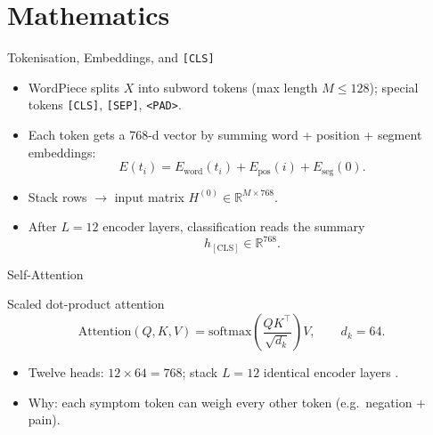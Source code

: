 \section{Mathematics}

\begin{frame}{Tokenisation, Embeddings, and \texttt{[CLS]}}
	\begin{itemize}
		\item WordPiece splits \(X\) into subword tokens (max length \(M \leq 128\)); special tokens \texttt{[CLS]}, \texttt{[SEP]}, \texttt{<PAD>}.
		\item Each token gets a 768-d vector by summing word + position + segment embeddings:
		\[
		  E(t_i) = E_{\mathrm{word}}(t_i) + E_{\mathrm{pos}}(i) + E_{\mathrm{seg}}(0).
		\]
		\item Stack rows \(\to\) input matrix \(H^{(0)} \in \mathbb{R}^{M \times 768}\).
		\item After \(L=12\) encoder layers, classification reads the summary
		\[
		  h_{\mathrm{[CLS]}} \in \mathbb{R}^{768}.
		\]
	\end{itemize}
\end{frame}

\begin{frame}{Self-Attention}
	\begin{block}{Scaled dot-product attention}
		\[
		  \mathrm{Attention}(Q,K,V)
		  = \mathrm{softmax}\!\left(\frac{QK^{\top}}{\sqrt{d_k}}\right)V,
		  \qquad d_k = 64.
		\]
	\end{block}
	\begin{center}
	\end{center}
	\begin{itemize}
		\item Twelve heads: \(12 \times 64 = 768\); stack \(L=12\) identical encoder layers \citep{vaswani2017attention}.
		\item Why: each symptom token can weigh every other token (e.g.\ negation + pain).
	\end{itemize}
\end{frame}

